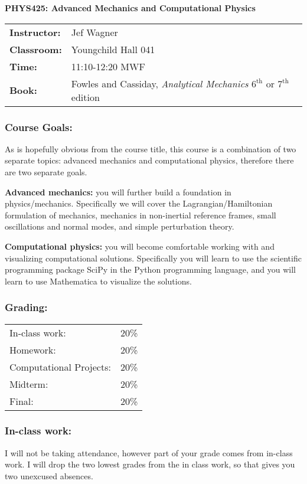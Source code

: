 \documentclass[10pt]{article}
\begin{document}
\thispagestyle{empty}
\begin{center}
{\Large \bf PHYS425: Advanced Mechanics and Computational Physics}
\end{center}

\vspace{0.5cm}

\begin{tabular}{ll}
{\bf Instructor:} & Jef Wagner \\
{\bf Classroom:} & Youngchild Hall 041 \\
{\bf Time:} & 11:10-12:20 MWF \\
{\bf Book:} & Fowles and Cassiday, {\it Analytical Mechanics} $6^{\text{th}}$ or $7^{\text{th}}$ edition 
\end{tabular}

\subsubsection*{Course Goals:}
As is hopefully obvious from the course title, this course is a combination of two separate topics: advanced mechanics and computational physics, therefore there are two separate goals. 

{\bf Advanced mechanics:} you will further build a foundation in physics/mechanics. Specifically we will cover the Lagrangian/Hamiltonian formulation of mechanics, mechanics in non-inertial reference frames, small oscillations and normal modes, and simple perturbation theory. 

{\bf Computational physics:} you will become comfortable working with and visualizing computational solutions. Specifically you will learn to use the scientific programming package SciPy in the Python programming language, and you will learn to use Mathematica to visualize the solutions.

\subsubsection*{Grading:}
\begin{tabular}{ll}
In-class work: & 20\% \\
Homework: & 20\% \\
Computational Projects: & 20\% \\
Midterm: & 20\% \\
Final: & 20\%
\end{tabular}

\subsubsection*{In-class work:}
I will not be taking attendance, however part of your grade comes from in-class work. I will drop the two lowest grades from the in class work, so that gives you two unexcused absences.
\end{document}
